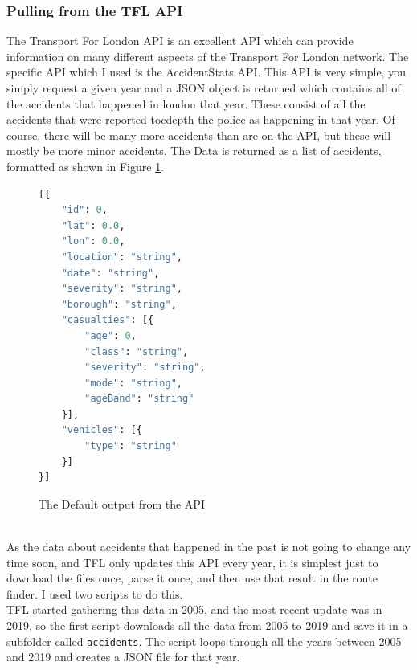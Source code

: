 \documentclass[11pt,twoside,a4paper]{article}
\begin{document}
\subsubsection{Pulling from the TFL API}
\label{Pulling from the TFL API}
The Transport For London API is an excellent API which can provide information on many different aspects of the Transport For London network. The specific API which I used is the AccidentStats API.
This API is very simple, you simply request a given year and a JSON object is returned which contains all of the accidents that happened in london that year. These consist of all the accidents that were reported tocdepth
the police as happening in that year. Of course, there will be many more accidents than are on the API, but these will mostly be more minor accidents.
The Data is returned as a list of accidents, formatted as shown in Figure \ref{Default}.
\begin{figure}[t]
\begin{lstlisting}[language=Python]
[{
    "id": 0,
    "lat": 0.0,
    "lon": 0.0,
    "location": "string",
    "date": "string",
    "severity": "string",
    "borough": "string",
    "casualties": [{
        "age": 0,
        "class": "string",
        "severity": "string",
        "mode": "string",
        "ageBand": "string"
    }],
    "vehicles": [{
        "type": "string"
    }]
}]
    \end{lstlisting}
\caption{The Default output from the API \cite{tflapi}}
\label{Default}
\end{figure}
\\
As the data about accidents that happened in the past is not going to change any time soon, and TFL only updates this API every year, it is simplest just to download the files once, parse it once, and then 
use that result in the route finder. I used two scripts to do this.\\
TFL started gathering this data in 2005, and the most recent update was in 2019, so the first script downloads all the data from 2005 to 2019 and save it in a subfolder called \texttt{accidents}.
The script loops through all the years between 2005 and 2019 and creates a JSON file for that year. \\
\end{document}
